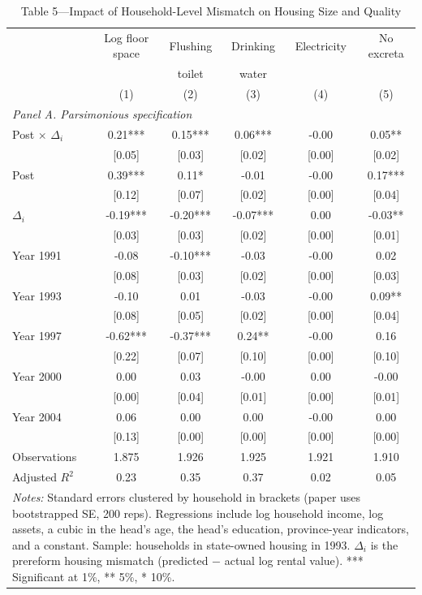 \begin{table}[htbp]
\centering
\small
\caption{Table 5---Impact of Household-Level Mismatch
 on Housing Size and Quality}
\label{tab:table5a}
\begin{tabular}{lccccc}
\toprule
 & Log floor space & Flushing & Drinking & Electricity & No excreta \\
 & & toilet & water & & \\
 & (1) & (2) & (3) & (4) & (5) \\
\midrule
\multicolumn{6}{l}{\textit{Panel A. Parsimonious specification}} \\
\addlinespace[3pt]
Post $\times$ $\Delta_i$ & 0.21*** & 0.15*** & 0.06*** & -0.00 & 0.05** \\
  & [0.05] & [0.03] & [0.02] & [0.00] & [0.02] \\
\addlinespace
Post & 0.39*** & 0.11* & -0.01 & -0.00 & 0.17*** \\
  & [0.12] & [0.07] & [0.02] & [0.00] & [0.04] \\
\addlinespace
$\Delta_i$ & -0.19*** & -0.20*** & -0.07*** & 0.00 & -0.03** \\
  & [0.03] & [0.03] & [0.02] & [0.00] & [0.01] \\
\addlinespace
Year 1991 & -0.08 & -0.10*** & -0.03 & -0.00 & 0.02 \\
  & [0.08] & [0.03] & [0.02] & [0.00] & [0.03] \\
\addlinespace
Year 1993 & -0.10 & 0.01 & -0.03 & -0.00 & 0.09** \\
  & [0.08] & [0.05] & [0.02] & [0.00] & [0.04] \\
\addlinespace
Year 1997 & -0.62*** & -0.37*** & 0.24** & -0.00 & 0.16 \\
  & [0.22] & [0.07] & [0.10] & [0.00] & [0.10] \\
\addlinespace
Year 2000 & 0.00 & 0.03 & -0.00 & 0.00 & -0.00 \\
  & [0.00] & [0.04] & [0.01] & [0.00] & [0.01] \\
\addlinespace
Year 2004 & 0.06 & 0.00 & 0.00 & -0.00 & 0.00 \\
  & [0.13] & [0.00] & [0.00] & [0.00] & [0.00] \\
\addlinespace
\midrule
Observations & 1.875 & 1.926 & 1.925 & 1.921 & 1.910 \\
Adjusted $R^2$ & 0.23 & 0.35 & 0.37 & 0.02 & 0.05 \\
\bottomrule
\multicolumn{6}{p{0.95\linewidth}}{\footnotesize
 \textit{Notes:} Standard errors clustered by household
 in brackets (paper uses bootstrapped SE, 200 reps).
 Regressions include log household income, log assets,
 a cubic in the head's age, the head's education,
 province-year indicators, and a constant.
 Sample: households in state-owned housing in 1993.
 $\Delta_i$ is the prereform housing mismatch
 (predicted $-$ actual log rental value).
 *** Significant at 1\%, ** 5\%, * 10\%.}
\end{tabular}
\end{table}

